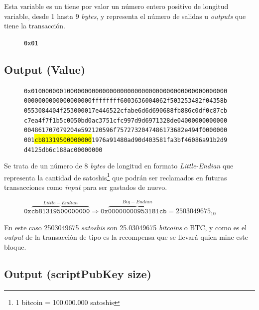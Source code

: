 \documentclass{article}
\begin{document}
    Esta variable es un tiene por valor un número entero positivo de longitud variable, desde 1 hasta 9 \textit{bytes}, y representa el número de salidas u \textit{outputs} que tiene la transacción.
    \begin{figure}[H]
        \texttt{0x01}
    \end{figure}
    
    \subsection{Output (Value)}
    
    \begin{figure}[H]
        \texttt{0x0100000001000000000000000000000000000000000000000000000} \\
        \texttt{0000000000000000000ffffffff6003636004062f503253482f04358b} \\
        \texttt{0553084404f253000017e446522cfabe6d6d690688fb886c0df0c87cb} \\
        \texttt{c7ea4f7f1b5c0050bd0ac3751cfc997d9d6971328de04000000000000} \\
        \texttt{004861707079204e592120596f7572732047486173682e494f0000000} \\
        \texttt{001\colorbox{Yellow}{cb81319500000000}1976a91480ad90d403581fa3bf46086a91b2d9} \\
        \texttt{d4125db6c188ac00000000}
    \end{figure}
    
    Se trata de un número de 8 \textit{bytes} de longitud en formato \textit{Little-Endian} que representa la cantidad de satoshis\footnote{1 bitcoin = 100.000.000 satoshis} que podrán ser reclamados en futuras transacciones como \textit{input} para ser gastados de nuevo.
    \begin{figure}[H]
    \centering
        $\texttt{0x}\overbrace{\texttt{cb81319500000000}}^{Little-Endian} \Rightarrow \texttt{0x}\overbrace{\texttt{00000000953181cb}}^{Big-Endian} = 2503049675_{10}$
    \end{figure}
    
    En este caso 2503049675 \textit{satoshis} son 25.03049675 \textit{bitcoins} o BTC, y como es el \textit{output} de la transacción de tipo  es la recompensa que se llevará quien mine este bloque.
    
    \subsection{Output (scriptPubKey size)}
    
\end{document}
